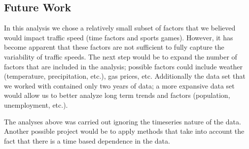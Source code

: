 \documentclass[12pt]{article}
\begin{document}
\subsection{Future Work}
In this analysis we chose a relatively small subset of factors that we believed would impact traffic speed (time factors and sports games). However, it has become apparent that these factors are not sufficient to fully capture the variability of traffic speeds. The next step would be to expand the number of factors that are included in the analysis; possible factors could include weather (temperature, precipitation, etc.), gas prices, etc. Additionally the data set that we worked with contained only two years of data; a more expansive data set would allow us to better analyze long term trends and factors (population, unemployment, etc.). 

The analyses above was carried out ignoring the timeseries nature of the data. Another possible project would be to apply methods that take into account the fact that there is a time based dependence in the data.
\end{document}
